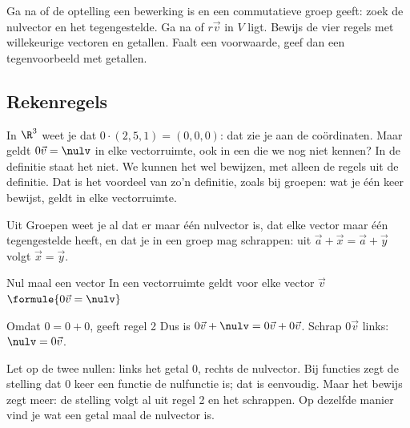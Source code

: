 \begin{werkwijze}
Ga na of de optelling een bewerking is en een commutatieve groep geeft: zoek de nulvector en het tegengestelde. Ga na of $r\vec v$ in $V$ ligt. Bewijs de vier regels met willekeurige vectoren en getallen. Faalt een voorwaarde, geef dan een tegenvoorbeeld met getallen.
\end{werkwijze}


\begin{oefeningen}
\end{oefeningen}

\subsection{Rekenregels}

In $\R^3$ weet je dat $0 \cdot (2, 5, 1) = (0, 0, 0)$: dat zie je aan de coördinaten. Maar geldt $0\vec v = \nulv$ in elke vectorruimte, ook in een die we nog niet kennen? In de definitie staat het niet. We kunnen het wel bewijzen, met alleen de regels uit de definitie. Dat is het voordeel van zo'n definitie, zoals bij groepen: wat je één keer bewijst, geldt in elke vectorruimte.

Uit Groepen weet je al dat er maar één nulvector is, dat elke vector maar één tegengestelde heeft, en dat je in een groep mag schrappen: uit $\vec a + \vec x = \vec a + \vec y$ volgt $\vec x = \vec y$.

\begin{theorie}
\begin{stelling}{Nul maal een vector}
In een vectorruimte geldt voor elke vector $\vec v$ \quad $\formule{0\vec v = \nulv}$
\end{stelling}

\begin{bewijs}
Omdat $0 = 0 + 0$, geeft regel 2
Dus is $0\vec v + \nulv = 0\vec v + 0\vec v$. Schrap $0\vec v$ links: $\nulv = 0\vec v$.
\end{bewijs}
\end{theorie}

Let op de twee nullen: links het getal 0, rechts de nulvector. Bij functies zegt de stelling dat 0 keer een functie de nulfunctie is; dat is eenvoudig. Maar het bewijs zegt meer: de stelling volgt al uit regel 2 en het schrappen. Op dezelfde manier vind je wat een getal maal de nulvector is.

